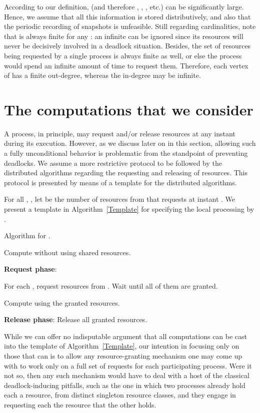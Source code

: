 \documentclass{article}
\begin{document}
According to our definition,  (and therefore , ,
, etc.) can be significantly large. Hence, we assume that all this
information is stored distributively, and also that the periodic recording of
snapshots is unfeasible. Still regarding cardinalities, note that  is
always finite for any : an infinite  can be ignored since
its resources will never be decisively involved in a deadlock situation.
Besides, the set of resources being requested by a single process is always
finite as well, or else the process would spend an infinite amount of time to
request them. Therefore, each vertex of  has a finite out-degree, whereas
the in-degree may be infinite.

\section{The computations that we consider}

A process, in principle, may request and/or release resources at any instant
during its execution. However, as we discuss later on in this section, allowing
such a fully unconditional behavior is problematic from the standpoint of
preventing deadlocks. We assume a more restrictive protocol to be followed by
the distributed algorithms regarding the requesting and releasing of resources.
This protocol is presented by means of a template for the distributed
algorithms. 

For all , , let  be the number of
resources from  that  requests at instant . We
present a template in Algorithm~\ref{Template} for specifying the local
processing by . 

\begin{algorithm}[t]
	\caption{Algorithm for .}
	\label{Template}
	\begin{algorithmic}[1]
				\State \parbox[t]{0.8\textwidth}{Compute without using shared resources.}
				\State \parbox[t]{0.8\textwidth}{\textbf{Request phase}: \parbox[t]{0.6\textwidth}{For each , request  resources from . Wait until all of them are granted.}}
				\State \parbox[t]{0.8\textwidth}{Compute using the granted resources.}
				\State \parbox[t]{0.8\textwidth}{\textbf{Release phase}: Release all granted resources.} \label{Template-Release}
			\EndWhile
		\EndProcedure
	\end{algorithmic}
\end{algorithm}

While we can offer no indisputable argument that all computations can be cast
into the template of Algorithm~\ref{Template}, our intention in focusing only
on those that can is to allow any resource-granting mechanism one may come up
with to work only on a full set of requests for each participating process. Were
it not so, then any such mechanism would have to deal with a host of the
classical deadlock-inducing pitfalls, such as the one in which two processes
already hold each a resource, from distinct singleton resource classes, and they
engage in requesting each the resource that the other holds.
\end{document}
